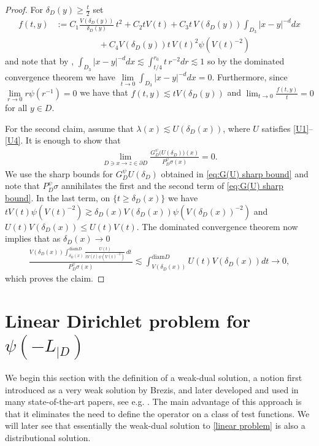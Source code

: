 \documentclass[12pt,a4paper,onecolumn]{article}
\theoremstyle{definition}
\newcommand{\1}{\mathbf 1}
\newcommand{\de}{\delta_D}
\newcommand{\Lo}{\psi(-L_{|D})}
\newcommand{\GDP}{G_D^\psi}
\newcommand{\PDS}{P^{\psi}_{ D}}
\newcommand{\diam}{\textrm{diam}}
\numberwithin{equation}{section}
\begin{document}
\begin{proof}
       For $\de(y)\ge \frac{t}2$ set
       \begin{align*}
       f(t,y)&:=C_1\frac{V(\de(y))}{\de(y)}\,t^2+C_2 t V(t)+C_3  t\,V(\de(y))\int_{D_3}|x-y|^{-d}dx\\
       &\hspace{5em}+C_4 V(\de(y))t\,V(t)^2\psi(V(t)^{-2})
       \end{align*}
       and note that by \cite[Eq. (A.30)]{Bio23cpaa}, $\int_{D_3}|x-y|^{-d}dx\lesssim \int_{t/4}^{r_0}t\, r^{-2}dr\lesssim 1$ so by the dominated convergence theorem we have $\lim\limits_{t\to 0}\int_{D_3}|x-y|^{-d}dx=0$. Furthermore, since $\lim\limits_{r\to 0}r\psi(r^{-1})=0$ we have that $f(t,y)\lesssim tV(\de(y))$ and
       $\lim_{t\to 0}\frac{f(t,y)}{t}=0$ for all $y\in D$.
                
        For the second claim, assume that $\lambda(x)\lesssim U(\de(x))$, where $U$ satisfies \ref{U1}--\ref{U4}. It is enough to show that 
        \begin{align*}
        	\lim_{D\ni x\to z\in\partial D}\frac{\GDP
        		\big(U(\de)\big)(x)}{\PDS\sigma(x)}=0.
        \end{align*}
        We use the sharp bounds for $\GDP U(\de)$ obtained in \eqref{eq:G(U) sharp bound} and note that $\PDS\sigma$ annihilates the first and the second term of  \eqref{eq:G(U) sharp bound}. In the last term, on $\{t\ge \de(x)\}$ we have $t V(t)\psi(V(t)^{-2})\gtrsim \de(x)V(\de(x))\psi(V(\de(x))^{-2})$ and  $U(t)V(\de(x))\le U(t)V(t)$. The dominated convergence theorem now implies that as $\de(x)\to 0$
        \begin{align*}
        	\frac{V(\de(x))\int_{\de(x)}^{\diam D}\frac{U(t)}{t V(t)\psi(V(t)^{-2})}\, dt\,}{\PDS\sigma(x)}\lesssim \int_{V(\de(x))}^{\diam D}U(t)V(\de(x))dt\to0,
        \end{align*}
        which proves the claim.
    \end{proof}

\section{Linear Dirichlet problem for $\Lo$}\label{s:linear problem}
	 We begin this section with the definition of a weak-dual solution, a notion first introduced as a very weak solution by Brezis, and later developed and used in many state-of-the-art papers, see e.g. \cite{Aba15a,Aba17,AGCV19,BFV-cvPDE18,CGcV-jfa21,BVW-na21,Bio23cpaa}. The main advantage of this approach is that it eliminates the need to define the operator on a class of test functions. We will later see that essentially the weak-dual solution to \eqref{linear problem} is also a distributional solution.
	
\end{document}
